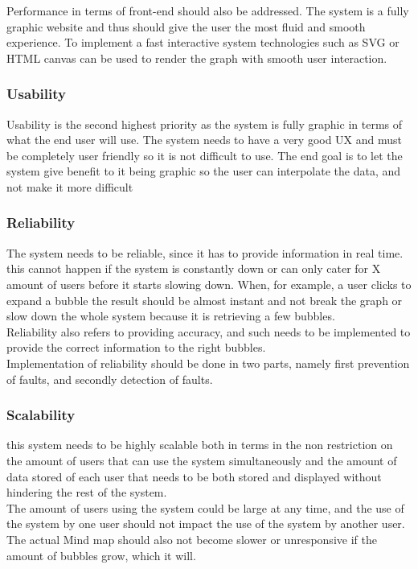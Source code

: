 \documentclass[hidelinks,english]{article}
\begin{document}
                Performance in terms of front-end should also be addressed. The system is a fully graphic website and thus should give the user the most fluid and smooth experience. To implement a fast interactive system technologies such as SVG or HTML canvas can be used to render the graph with smooth user interaction.
            \subsubsection{Usability}
                Usability is the second highest priority as the system is fully graphic in terms of what the end user will use. The system needs to have a very good UX and must be completely user friendly so it is not difficult to use. The end goal is to let the system give benefit to it being graphic so the user can interpolate the data, and not make it more difficult
            \subsubsection{Reliability}
                The system needs to be reliable, since it has to provide information in real time. this cannot happen if the system is constantly down or can only cater for X amount of users before it starts slowing down. When, for example, a user clicks to expand a bubble the result should be almost instant and not break the graph or slow down the whole system because it is retrieving a few bubbles.\\
                
                Reliability also refers to providing accuracy, and such needs to be implemented to provide the correct information to the right bubbles.
                \\
                Implementation of reliability should be done in two parts, namely first prevention of faults, and secondly detection of faults.
            \subsubsection{Scalability}
                this system needs to be highly scalable both in terms in the non restriction on the amount of users that can use the system simultaneously and the amount of data stored of each user that needs to be both stored and displayed without hindering the rest of the system.\\
            
                
                The amount of users using the system could be large at any time, and the use of the system by one user should not impact the use of the system by another user. The actual Mind map should also not become slower or unresponsive if the amount of bubbles grow, which it will.\\
                
\end{document}
